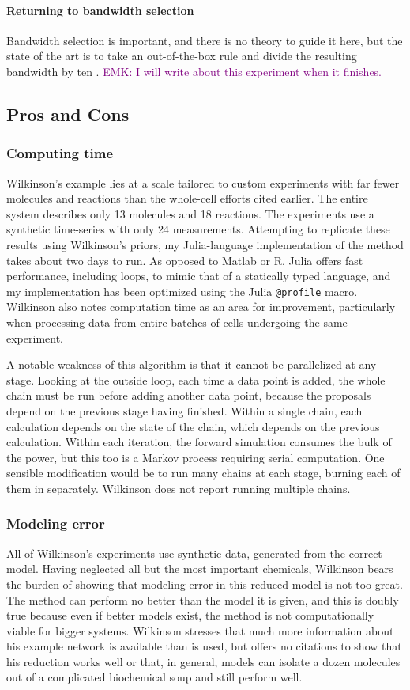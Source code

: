 \documentclass{article}
\newcommand\EMK[1]{\textcolor{purple}{EMK: #1}}
\begin{document}
\paragraph{Returning to bandwidth selection}
Bandwidth selection is important, and there is no theory to guide it here, but the state of the art is to take an out-of-the-box rule and divide the resulting bandwidth by ten \cite{wilk_email}. \EMK{I will write about this experiment when it finishes.}

\subsection{Pros and Cons}
\subsubsection{Computing time}
Wilkinson's example lies at a scale tailored to custom experiments with far fewer molecules and reactions than the whole-cell efforts cited earlier. The entire system describes only 13 molecules and 18 reactions. The experiments use a synthetic time-series with only 24 measurements. Attempting to replicate these results using Wilkinson's priors, my Julia-language implementation of the method takes about two days to run. As opposed to Matlab or R, Julia offers fast performance, including loops, to mimic that of a statically typed language, and my implementation has been optimized using the Julia \texttt{@profile} macro. Wilkinson also notes computation time as an area for improvement, particularly when processing data from entire batches of cells undergoing the same experiment.

A notable weakness of this algorithm is that it cannot be parallelized at any stage. Looking at the outside loop, each time a data point is added, the whole chain must be run before adding another data point, because the proposals depend on the previous stage having finished. Within a single chain, each calculation depends on the state of the chain, which depends on the previous calculation. Within each iteration, the forward simulation consumes the bulk of the power, but this too is a Markov process requiring serial computation. One sensible modification would be to run many chains at each stage, burning each of them in separately. Wilkinson does not report running multiple chains.

\subsubsection{Modeling error}
All of Wilkinson's experiments use synthetic data, generated from the correct model. Having neglected all but the most important chemicals, Wilkinson bears the burden of showing that modeling error in this reduced model is not too great. The method can perform no better than the model it is given, and this is doubly true because even if better models exist, the method is not computationally viable for bigger systems. Wilkinson stresses that much more information about his example network is available than is used, but offers no citations to show that his reduction works well or that, in general, models can isolate a dozen molecules out of a complicated biochemical soup and still perform well.
\end{document}
